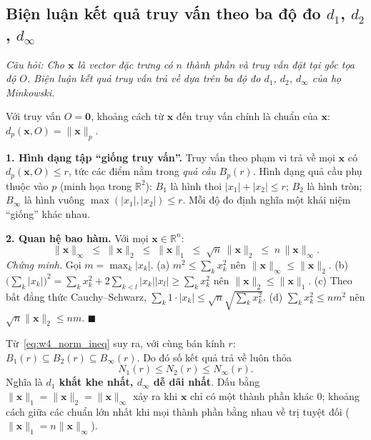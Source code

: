 \subsection{Biện luận kết quả truy vấn theo ba độ đo $d_1$, $d_2$, $d_\infty$}
\label{subsec:w4_query}

\textit{Câu hỏi: Cho $\mathbf{x}$ là vector đặc trưng có $n$ thành phần và truy vấn đặt tại gốc tọa độ $O$. Biện luận kết quả truy vấn trả về dựa trên ba độ đo $d_1$, $d_2$, $d_\infty$ của họ Minkowski.}

Với truy vấn $O = \mathbf{0}$, khoảng cách từ $\mathbf{x}$ đến truy vấn chính là chuẩn của $\mathbf{x}$: $d_p(\mathbf{x}, O) = \|\mathbf{x}\|_p$.

\textbf{1. Hình dạng tập ``giống truy vấn''.} Truy vấn theo phạm vi trả về mọi $\mathbf{x}$ có $d_p(\mathbf{x}, O) \le r$, tức các điểm nằm trong \emph{quả cầu} $B_p(r)$. Hình dạng quả cầu phụ thuộc vào $p$ (minh họa trong $\mathbb{R}^2$): $B_1$ là hình thoi $|x_1| + |x_2| \le r$; $B_2$ là hình tròn; $B_\infty$ là hình vuông $\max(|x_1|, |x_2|) \le r$. Mỗi độ đo định nghĩa một khái niệm ``giống'' khác nhau.

\textbf{2. Quan hệ bao hàm.} Với mọi $\mathbf{x} \in \mathbb{R}^n$:
\begin{equation}
\|\mathbf{x}\|_\infty \;\le\; \|\mathbf{x}\|_2 \;\le\; \|\mathbf{x}\|_1 \;\le\; \sqrt{n}\, \|\mathbf{x}\|_2 \;\le\; n\, \|\mathbf{x}\|_\infty.
\label{eq:w4_norm_ineq}
\end{equation}
\emph{Chứng minh.} Gọi $m = \max_k |x_k|$. (a) $m^2 \le \sum_k x_k^2$ nên $\|\mathbf{x}\|_\infty \le \|\mathbf{x}\|_2$. (b) $\big(\sum_k |x_k|\big)^2 = \sum_k x_k^2 + 2\sum_{k<l} |x_k||x_l| \ge \sum_k x_k^2$ nên $\|\mathbf{x}\|_2 \le \|\mathbf{x}\|_1$. (c) Theo bất đẳng thức Cauchy--Schwarz, $\sum_k 1 \cdot |x_k| \le \sqrt{n} \sqrt{\sum_k x_k^2}$. (d) $\sum_k x_k^2 \le n m^2$ nên $\sqrt{n}\|\mathbf{x}\|_2 \le n m$. $\blacksquare$

Từ~\eqref{eq:w4_norm_ineq} suy ra, với cùng bán kính $r$: $B_1(r) \subseteq B_2(r) \subseteq B_\infty(r)$. Do đó số kết quả trả về luôn thỏa
\begin{equation}
N_1(r) \le N_2(r) \le N_\infty(r).
\end{equation}
Nghĩa là \textbf{$d_1$ khắt khe nhất, $d_\infty$ dễ dãi nhất}. Dấu bằng $\|\mathbf{x}\|_1 = \|\mathbf{x}\|_2 = \|\mathbf{x}\|_\infty$ xảy ra khi $\mathbf{x}$ chỉ có một thành phần khác $0$; khoảng cách giữa các chuẩn lớn nhất khi mọi thành phần bằng nhau về trị tuyệt đối ($\|\mathbf{x}\|_1 = n\|\mathbf{x}\|_\infty$).

